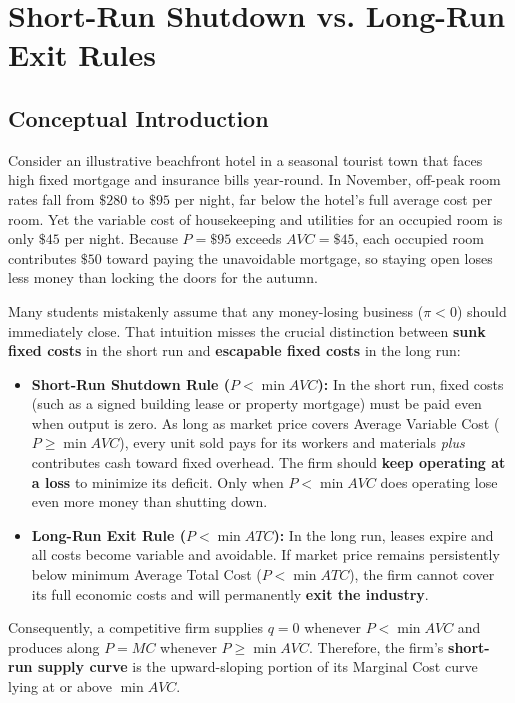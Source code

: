 \documentclass[11pt,letterpaper]{article}
\begin{document}
\section{Short-Run Shutdown vs. Long-Run Exit Rules}

\subsection*{Conceptual Introduction}
Consider an illustrative beachfront hotel in a seasonal tourist town that faces high fixed mortgage and insurance bills year-round. In November, off-peak room rates fall from $\$280$ to $\$95$ per night, far below the hotel's full average cost per room. Yet the variable cost of housekeeping and utilities for an occupied room is only $\$45$ per night. Because $P = \$95$ exceeds $AVC = \$45$, each occupied room contributes $\$50$ toward paying the unavoidable mortgage, so staying open loses less money than locking the doors for the autumn.

Many students mistakenly assume that any money-losing business ($\pi < 0$) should immediately close. That intuition misses the crucial distinction between \textbf{sunk fixed costs} in the short run and \textbf{escapable fixed costs} in the long run:
\begin{itemize}
    \item \textbf{Short-Run Shutdown Rule ($P < \min AVC$):} In the short run, fixed costs (such as a signed building lease or property mortgage) must be paid even when output is zero. As long as market price covers Average Variable Cost ($P \ge \min AVC$), every unit sold pays for its workers and materials \emph{plus} contributes cash toward fixed overhead. The firm should \textbf{keep operating at a loss} to minimize its deficit. Only when $P < \min AVC$ does operating lose even more money than shutting down.
    \item \textbf{Long-Run Exit Rule ($P < \min ATC$):} In the long run, leases expire and all costs become variable and avoidable. If market price remains persistently below minimum Average Total Cost ($P < \min ATC$), the firm cannot cover its full economic costs and will permanently \textbf{exit the industry}.
\end{itemize}
Consequently, a competitive firm supplies $q = 0$ whenever $P < \min AVC$ and produces along $P = MC$ whenever $P \ge \min AVC$. Therefore, the firm's \textbf{short-run supply curve} is the upward-sloping portion of its Marginal Cost curve lying at or above $\min AVC$.
\end{document}
